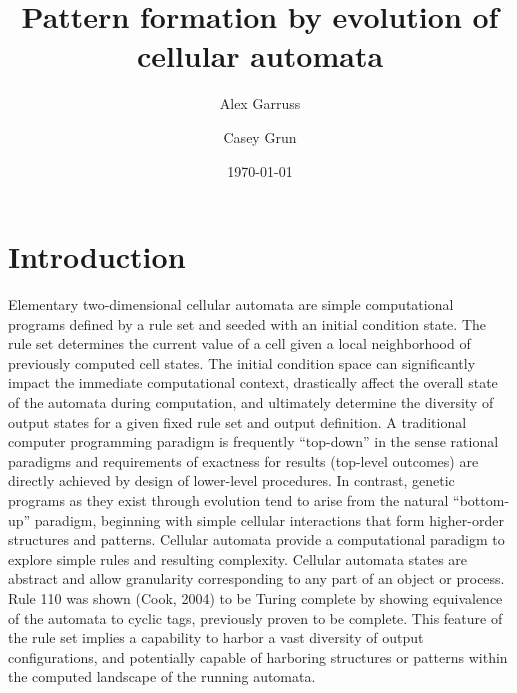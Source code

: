 \documentclass[twocolumn]{article}
\title{Pattern formation by evolution of cellular automata}
\author{Alex Garruss \and Casey Grun}
\date{\today}
\begin{document}
\maketitle

\section{Introduction}

Elementary two-dimensional cellular automata are simple computational programs defined by a rule set and seeded with an initial condition state.  The rule set determines the current value of a cell given a local neighborhood of previously computed cell states.  The initial condition space can significantly impact the immediate computational context, drastically affect the overall state of the automata during computation, and ultimately determine the diversity of output states for a given fixed rule set and output definition.
A traditional computer programming paradigm is frequently ``top-down'' in the sense rational paradigms and requirements of exactness for results (top-level outcomes) are directly achieved by design of lower-level procedures.  In contrast, genetic programs as they exist through evolution tend to arise from the natural ``bottom-up'' paradigm, beginning with simple cellular interactions that form higher-order structures and patterns.
Cellular automata provide a computational paradigm to explore simple rules and resulting complexity.  Cellular automata states are abstract and allow granularity corresponding to any part of an object or process.  Rule 110 was shown (Cook, 2004) to be Turing complete by showing equivalence of the automata to cyclic tags, previously proven to be complete.  This feature of the rule set implies a capability to harbor a vast diversity of output configurations, and potentially capable of harboring structures or patterns within the computed landscape of the running automata.
\end{document}
